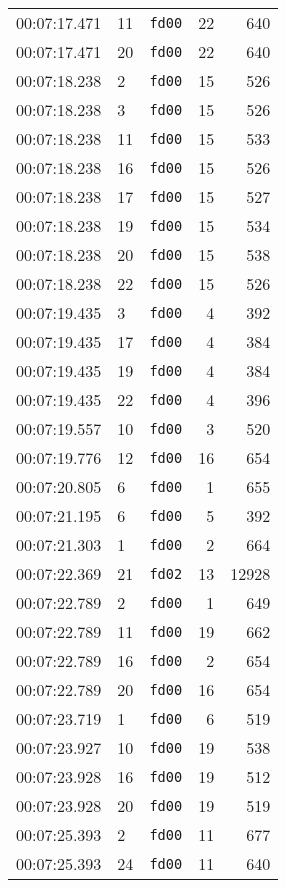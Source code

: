 \documentclass{article}
\begin{document}
\begin{longtable}{lllrr}
00:07:17.471 & 11 & \texttt{fd00} & 22 & 640 \\
00:07:17.471 & 20 & \texttt{fd00} & 22 & 640 \\
00:07:18.238 & 2 & \texttt{fd00} & 15 & 526 \\
00:07:18.238 & 3 & \texttt{fd00} & 15 & 526 \\
00:07:18.238 & 11 & \texttt{fd00} & 15 & 533 \\
00:07:18.238 & 16 & \texttt{fd00} & 15 & 526 \\
00:07:18.238 & 17 & \texttt{fd00} & 15 & 527 \\
00:07:18.238 & 19 & \texttt{fd00} & 15 & 534 \\
00:07:18.238 & 20 & \texttt{fd00} & 15 & 538 \\
00:07:18.238 & 22 & \texttt{fd00} & 15 & 526 \\
00:07:19.435 & 3 & \texttt{fd00} & 4 & 392 \\
00:07:19.435 & 17 & \texttt{fd00} & 4 & 384 \\
00:07:19.435 & 19 & \texttt{fd00} & 4 & 384 \\
00:07:19.435 & 22 & \texttt{fd00} & 4 & 396 \\
00:07:19.557 & 10 & \texttt{fd00} & 3 & 520 \\
00:07:19.776 & 12 & \texttt{fd00} & 16 & 654 \\
00:07:20.805 & 6 & \texttt{fd00} & 1 & 655 \\
00:07:21.195 & 6 & \texttt{fd00} & 5 & 392 \\
00:07:21.303 & 1 & \texttt{fd00} & 2 & 664 \\
00:07:22.369 & 21 & \texttt{fd02} & 13 & 12928 \\
00:07:22.789 & 2 & \texttt{fd00} & 1 & 649 \\
00:07:22.789 & 11 & \texttt{fd00} & 19 & 662 \\
00:07:22.789 & 16 & \texttt{fd00} & 2 & 654 \\
00:07:22.789 & 20 & \texttt{fd00} & 16 & 654 \\
00:07:23.719 & 1 & \texttt{fd00} & 6 & 519 \\
00:07:23.927 & 10 & \texttt{fd00} & 19 & 538 \\
00:07:23.928 & 16 & \texttt{fd00} & 19 & 512 \\
00:07:23.928 & 20 & \texttt{fd00} & 19 & 519 \\
00:07:25.393 & 2 & \texttt{fd00} & 11 & 677 \\
00:07:25.393 & 24 & \texttt{fd00} & 11 & 640 \\

\end{longtable}
\end{document}
